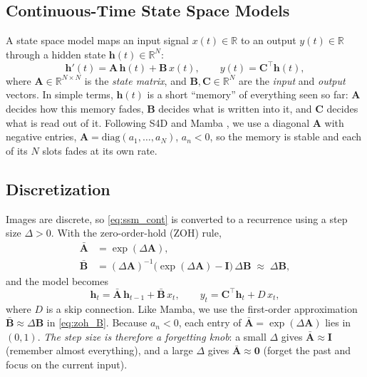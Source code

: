 \documentclass[journal]{IEEEtran}
\newcommand{\R}{\mathbb{R}}
\newcommand{\vect}[1]{\bm{#1}}
\newcommand{\Dt}{\Delta}
\begin{document}
\subsection{Continuous-Time State Space Models}
A state space model maps an input signal $x(t)\in\R$ to an output $y(t)\in\R$ through a hidden state $\vect{h}(t)\in\R^{N}$:
\begin{equation}
  \vect{h}'(t) = \vect{A}\,\vect{h}(t) + \vect{B}\,x(t), \qquad y(t) = \vect{C}^{\top}\vect{h}(t),
  \label{eq:ssm_cont}
\end{equation}
where $\vect{A}\in\R^{N\times N}$ is the \emph{state matrix}, and $\vect{B},\vect{C}\in\R^{N}$ are the \emph{input} and \emph{output} vectors. In simple terms, $\vect{h}(t)$ is a short ``memory'' of everything seen so far: $\vect{A}$ decides how this memory fades, $\vect{B}$ decides what is written into it, and $\vect{C}$ decides what is read out of it. Following S4D and Mamba \cite{gu2022s4d,gu2023mamba}, we use a diagonal $\vect{A}$ with negative entries, $\vect{A}=\mathrm{diag}(a_1,\dots,a_N)$, $a_n<0$, so the memory is stable and each of its $N$ slots fades at its own rate.

\subsection{Discretization}
Images are discrete, so \eqref{eq:ssm_cont} is converted to a recurrence using a step size $\Dt>0$. With the zero-order-hold (ZOH) rule,
\begin{align}
  \bar{\vect{A}} &= \exp(\Dt\vect{A}), \label{eq:zoh_A}\\
  \bar{\vect{B}} &= (\Dt\vect{A})^{-1}\big(\exp(\Dt\vect{A})-\vect{I}\big)\,\Dt\vect{B} \;\approx\; \Dt\vect{B}, \label{eq:zoh_B}
\end{align}
and the model becomes
\begin{equation}
  \vect{h}_t = \bar{\vect{A}}\,\vect{h}_{t-1} + \bar{\vect{B}}\,x_t, \qquad y_t = \vect{C}^{\top}\vect{h}_t + D\,x_t,
  \label{eq:ssm_disc}
\end{equation}
where $D$ is a skip connection. Like Mamba, we use the first-order approximation $\bar{\vect{B}}\approx\Dt\vect{B}$ in \eqref{eq:zoh_B}. Because $a_n<0$, each entry of $\bar{\vect{A}}=\exp(\Dt\vect{A})$ lies in $(0,1)$. \emph{The step size is therefore a forgetting knob}: a small $\Dt$ gives $\bar{\vect{A}}\approx\vect{I}$ (remember almost everything), and a large $\Dt$ gives $\bar{\vect{A}}\approx\vect{0}$ (forget the past and focus on the current input).
\end{document}

